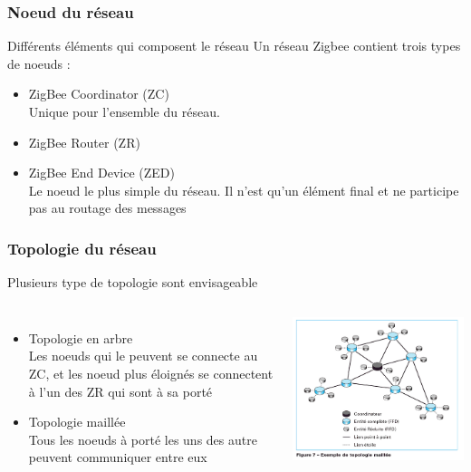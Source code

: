 \documentclass{beamer}
\begin{document}
  \begin{frame}
   \frametitle{Noeud du réseau}
   \begin{block}{Différents éléments qui composent le réseau}
    Un réseau Zigbee contient trois types de noeuds :
    \begin{itemize}
     \item ZigBee Coordinator (ZC)\\
     Unique pour l'ensemble du réseau.
     \item ZigBee Router (ZR)
     \item ZigBee End Device (ZED)\\
     Le noeud le plus simple du réseau. Il n'est qu'un élément final et ne participe pas au routage des messages
    \end{itemize}
   \end{block}
  \end{frame}
  
  \begin{frame}
   \frametitle{Topologie du réseau}
   \begin{block}{Plusieurs type de topologie sont envisageable}
   \begin{columns}
    \begin{itemize}
     \item Topologie en arbre\\
     Les noeuds qui le peuvent se connecte au ZC, et les noeud plus éloignés se connectent à l'un des ZR qui sont à sa porté
     \item Topologie maillée\\
     Tous les noeuds à porté les uns des autre peuvent communiquer entre eux
    \end{itemize}

    \includegraphics[scale=0.3]{Topologie-Maille.png}
   \end{columns}
   \end{block}
  \end{frame}
  
\end{document}
